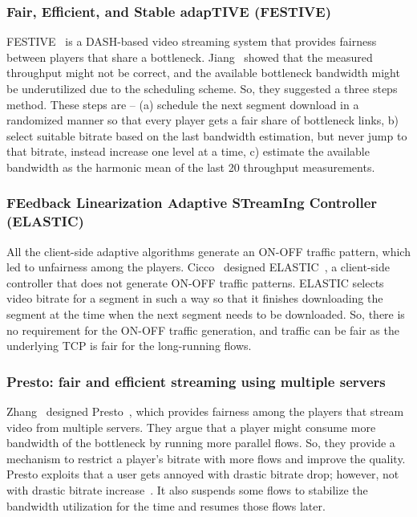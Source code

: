 \subsubsection{Fair, Efficient, and Stable adapTIVE (FESTIVE)}
FESTIVE~\cite{10.1145/2413176.2413189} is a DASH-based video streaming system that provides fairness between players that share a bottleneck. Jiang \etal\ showed that the measured throughput might not be correct, and the available bottleneck bandwidth might be underutilized due to the scheduling scheme. So, they suggested a three steps method. These steps are --
(a) schedule the next segment download in a randomized manner so that every player gets a fair share of bottleneck links,
b) select suitable bitrate based on the last bandwidth estimation, but never jump to that bitrate, instead increase one level at a time,
c) estimate the available bandwidth as the harmonic mean of the last 20 throughput measurements.


\subsubsection{FEedback Linearization Adaptive STreamIng Controller (ELASTIC)}
All the client-side adaptive algorithms generate an ON-OFF traffic pattern, which led to unfairness among the players. Cicco \etal\ designed ELASTIC~\cite{6691442}, a client-side controller that does not generate ON-OFF traffic patterns. ELASTIC selects video bitrate for a segment in such a way so that it finishes downloading the segment at the time when the next segment needs to be downloaded. So, there is no requirement for the ON-OFF traffic generation, and traffic can be fair as the underlying TCP is fair for the long-running flows.

\subsubsection{Presto: fair and efficient streaming using multiple servers}
Zhang \etal\ designed Presto~\cite{7249417}, which provides fairness among the players that stream video from multiple servers. They argue that a player might consume more bandwidth of the bottleneck by running more parallel flows. So, they provide a mechanism to restrict a player's bitrate with more flows and improve the quality. Presto exploits that a user gets annoyed with drastic bitrate drop; however, not with drastic bitrate increase~\cite{10.1145/2018602.2018611}. It also suspends some flows to stabilize the bandwidth utilization for the time and resumes those flows later.

